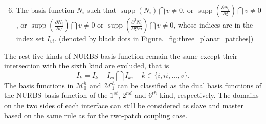 \documentclass[preprint,12pt]{elsarticle}
\newcommand{\supp}{\mathop{\mathrm{supp}}}
\begin{document}
\begin{enumerate}
    \setcounter{enumi}{5}
    \item The basis function $N_i$ such that $\supp(N_i)\bigcap{v}\neq{}0$, or $\supp(\frac{\partial{}N_i}{\partial\xi})\bigcap{v}\neq{}0$,  or $\supp(\frac{\partial{}N_i}{\partial\eta})\bigcap{v}\neq{}0$ or $\supp(\frac{\partial^2{}N_i}{\partial\xi\partial\eta})\bigcap{v}\neq{}0$, whose indices are in the index set $I_{vi}$. (denoted by black dots in Figure.~\ref{fig:three_planar_patches})
\end{enumerate}
The rest five kinds of NURBS basis function remain the same except their intersection with the sixth kind are excluded, that is
\begin{equation}
    I_k=I_k-I_{vi}\bigcap{}I_k, \quad k\in\{i,ii,\dots,v\}.
\end{equation}
The basis functions in $\mathcal{M}_0^h$ and $\mathcal{M}_1^h$ can be classified as the dual basis functions of the NURBS basis function of the $1^{st}$, $2^{nd}$ and $6^{th}$ kind, respectively. The domains on the two sides of each interface can still be considered as slave and master based on the same rule as for the two-patch coupling case.
\end{document}
